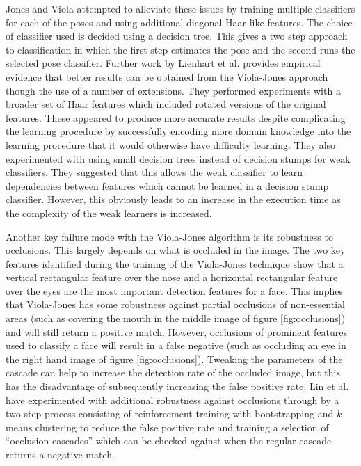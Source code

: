 \documentclass[conference]{IEEEtran}
\begin{document}
Jones and Viola \cite{jones2003fast} attempted to alleviate these issues by training multiple classifiers for each of the poses and using additional diagonal Haar like features. The choice of classifier used is decided using a decision tree. This gives a two step approach to classification in which the first step estimates the pose and the second runs the selected pose classifier. Further work by Lienhart et al. \cite{lienhart2002extended} provides empirical evidence that better results can be obtained from the Viola-Jones approach though the use of a number of extensions. They performed experiments with a broader set of Haar features which included rotated versions of the original features. These appeared to produce more accurate results despite complicating the learning procedure by successfully encoding more domain knowledge into the learning procedure that it would otherwise have difficulty learning. They also experimented with using small decision trees instead of decision stumps for weak classifiers. They suggested that this allows the weak classifier to learn dependencies between features which cannot be learned in a decision stump classifier. However, this obviously leads to an increase in the execution time as the complexity of the weak learners is increased.

Another key failure mode with the Viola-Jones algorithm is its robustness to occlusions. This largely depends on what is occluded in the image. The two key features identified during the training of the Viola-Jones technique show that a vertical rectangular feature over the nose and a horizontal rectangular feature over the eyes are the most important detection features for a face. This implies that Viola-Jones has some robustness against partial occlusions of non-essential areas (such as covering the mouth in the middle image of figure \ref{fig:occlusions}) and will still return a positive match. However, occlusions of prominent features used to classify a face will result in a false negative (such as occluding an eye in the right hand image of figure \ref{fig:occlusions}). Tweaking the parameters of the cascade can help to increase the detection rate of the occluded image, but this has the disadvantage of subsequently increasing the false positive rate. Lin et al. \cite{lin2004fast} have experimented with additional robustness against occlusions through by a two step process consisting of reinforcement training with bootstrapping and $k$-means clustering to reduce the false positive rate and training a selection of ``occlusion cascades'' which can be checked against when the regular cascade returns a negative match.
\end{document}
